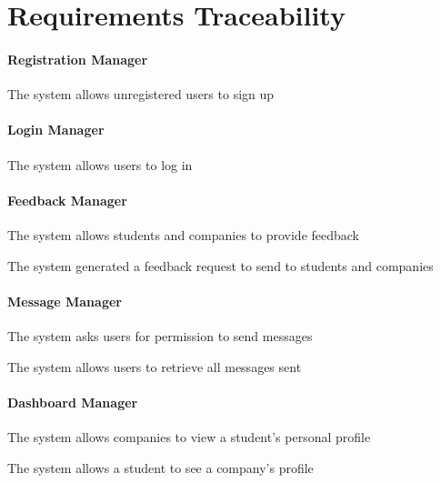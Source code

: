 \chapter{Requirements Traceability}

\subsubsection*{Registration Manager}
\begin{enumerate}[label={\textbf{[R\arabic*]}}, leftmargin=1.35cm]
    \item The system allows unregistered users to sign up 
\end{enumerate}

\subsubsection*{Login Manager}
\begin{enumerate}[label={\textbf{[R\arabic*]}}, leftmargin=1.35cm]
    \setcounter{enumi}{1}
    \item The system allows users to log in
\end{enumerate}

\subsubsection*{Feedback Manager}
\begin{enumerate}[label={\textbf{[R\arabic*]}}, leftmargin=1.35cm]
    \setcounter{enumi}{29}
    \item The system allows students and companies to provide feedback
    \item The system generated a feedback request to send to students and companies
\end{enumerate}


\subsubsection*{Message Manager}
\begin{enumerate}[label={\textbf{[R\arabic*]}}, leftmargin=1.35cm]
    \setcounter{enumi}{24}
    \item The system asks users for permission to send messages
    \setcounter{enumi}{27}
    \item The system allows users to retrieve all messages sent
\end{enumerate}

\subsubsection*{Dashboard Manager}
\begin{enumerate}[label={\textbf{[R\arabic*]}}, leftmargin=1.35cm]
    \setcounter{enumi}{5}
    \item The system allows companies to view a student's personal profile
    \setcounter{enumi}{8}
    \item The system allows a student to see a company’s profile
\end{enumerate}

